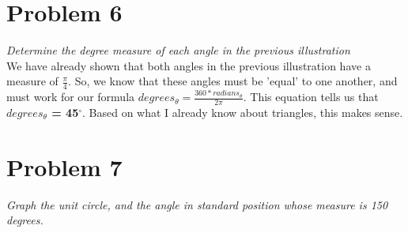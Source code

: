 \documentclass[11pt]{article} %
\newcommand\tab[1][1cm]{\hspace*{#1}}
\begin{document}
\section{Problem 6}
\textit{Determine the degree measure of each angle in the previous illustration}
\\
\tab We have already shown that both angles in the previous illustration have a measure of $\frac{\pi}{4}$. So, we know that these angles must be 'equal' to one another, and must work for our formula $degrees_\theta = \frac{360*radians_\theta}{2\pi}$. This equation tells us that \textbf{$degrees_\theta$ = 45$^{\circ}$}. Based on what I already know about triangles, this makes sense. 

\section{Problem 7}
\textit{Graph the unit circle, and the angle in standard position whose measure is 150 degrees.}
\end{document}
